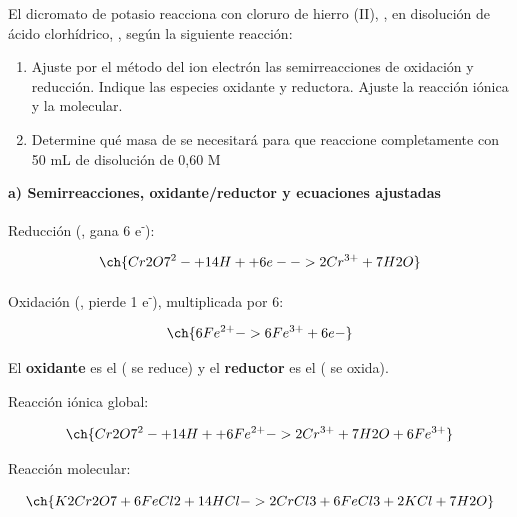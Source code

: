 \begin{exerciseEVAU}
El dicromato de potasio  reacciona con cloruro de hierro (II), , en disolución de ácido
clorhídrico, , según la siguiente reacción:
\begin{centeredequation}
\end{centeredequation}
\begin{enumerate}[label=\letraminuscula]
    \item  Ajuste por el método del ion electrón las semirreacciones de oxidación y reducción. Indique
las especies oxidante y reductora. Ajuste la reacción iónica y la molecular.
    \item  Determine qué masa de  se necesitará para que reaccione completamente con 50 mL de disolución de  0,60 M
\end{enumerate}
\begin{solu}

    \textbf{a) Semirreacciones, oxidante/reductor y ecuaciones ajustadas}

    Reducción (, gana 6 e\textsuperscript{-}):

    \begin{equation*}
        \ch{Cr2O7^2- + 14 H+ + 6 e- -> 2 Cr^{3+} + 7 H2O}
    \end{equation*}

    Oxidación (, pierde 1 e\textsuperscript{-}), multiplicada por 6:

    \begin{equation*}
        \ch{6 Fe^{2+} -> 6 Fe^{3+} + 6 e-}
    \end{equation*}

    El \textbf{oxidante} es el  ( se reduce) y el \textbf{reductor} es el  ( se oxida).

    Reacción iónica global:

    \begin{equation*}
        \ch{Cr2O7^2- + 14 H+ + 6 Fe^{2+} -> 2 Cr^{3+} + 7 H2O + 6 Fe^{3+}}
    \end{equation*}

    Reacción molecular:

    \begin{equation*}
        \ch{K2Cr2O7 + 6 FeCl2 + 14 HCl -> 2 CrCl3 + 6 FeCl3 + 2 KCl + 7 H2O}
    \end{equation*}


\end{solu}
\end{exerciseEVAU}

